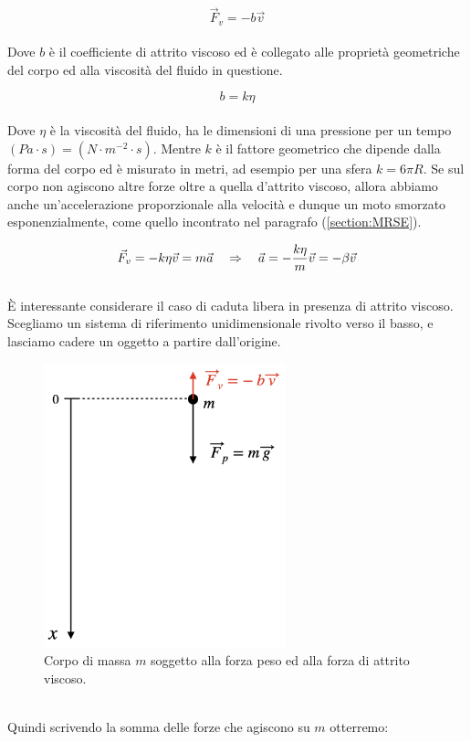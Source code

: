 \begin{equation}
    \vec F_v = -b\vec v
\label{eq:forces:viscous}
\end{equation}
\\
Dove $b$ è il coefficiente di attrito viscoso ed è collegato alle proprietà
geometriche del corpo ed alla viscosità del fluido in questione.

\begin{equation}
    b = k\eta
\label{eq:forces:viscous_coefficient}
\end{equation}
\\
Dove $\eta$ è la viscosità del fluido, ha le dimensioni di una pressione per
un tempo $(Pa \cdot s) =(N\cdot m^{-2}\cdot s)$. Mentre $k$ è il fattore
geometrico che dipende dalla forma del corpo ed è misurato in metri, ad
esempio per una sfera $k = 6\pi R$.
Se sul corpo non agiscono altre forze oltre a quella d'attrito viscoso,
allora abbiamo anche un'accelerazione proporzionale alla velocità e dunque
un moto smorzato esponenzialmente, come quello incontrato nel paragrafo (\ref{section:MRSE}).

\begin{equation}
    \vec F_v = -k\eta\vec v = m\vec a \quad\Rightarrow\quad
    \vec a = -\frac{k\eta}m\vec v =-\beta \vec v 
\end{equation}
\\
È interessante considerare il caso di caduta libera in presenza di attrito
viscoso. Scegliamo un sistema di riferimento unidimensionale rivolto verso
il basso, e lasciamo cadere un oggetto a partire dall'origine.
\begin{figure}[htbp]
    \begin{center}
        \includegraphics[width=7cm]{images/cadlibera.png}
        \caption{Corpo di massa $m$ soggetto alla forza peso ed
        alla forza di attrito viscoso.}
\end{center}
\label{fig:forces:freefall}
\end{figure}
\\
Quindi scrivendo la somma delle forze che agiscono su $m$ otterremo:

